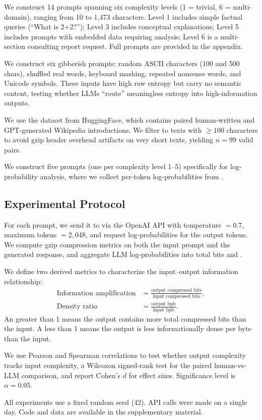 We construct 14 prompts spanning six complexity levels (1 = trivial, 6 = multi-domain), ranging from 10 to 1{,}473 characters. Level 1 includes simple factual queries (\eg ``What is 2+2?''); Level 3 includes conceptual explanations; Level 5 includes prompts with embedded data requiring analysis; Level 6 is a multi-section consulting report request. Full prompts are provided in the appendix.

We construct six gibberish prompts: random ASCII characters (100 and 500 chars), shuffled real words, keyboard mashing, repeated nonsense words, and Unicode symbols. These inputs have high raw entropy but carry no semantic content, testing whether LLMs ``route'' meaningless entropy into high-information outputs.

We use the \gptwiki dataset from HuggingFace, which contains paired human-written and GPT-generated Wikipedia introductions. We filter to texts with $\geq 100$ characters to avoid gzip header overhead artifacts on very short texts, yielding $n = 99$ valid pairs.

We construct five prompts (one per complexity level 1--5) specifically for log-probability analysis, where we collect per-token log-probabilities from \gptmini.

\subsection{Experimental Protocol}
\label{sec:protocol}

For each prompt, we send it to \gptmini via the OpenAI API with temperature $= 0.7$, maximum tokens $= 2{,}048$, and request log-probabilities for the output tokens. We compute gzip compression metrics on both the input prompt and the generated response, and aggregate LLM log-probabilities into total bits and \bpt.

We define two derived metrics to characterize the input--output information relationship:
\begin{align}
    \text{Information amplification} &= \frac{\text{output compressed bits}}{\text{input compressed bits}}, \label{eq:amp} \\
    \text{Density ratio} &= \frac{\text{output bpb}}{\text{input bpb}}. \label{eq:density}
\end{align}
An \infoamp greater than 1 means the output contains more total compressed bits than the input. A \densityratio less than 1 means the output is less informationally dense per byte than the input.

We use Pearson and Spearman correlations to test whether output complexity tracks input complexity, a Wilcoxon signed-rank test for the paired human-vs-LLM comparison, and report Cohen's $d$ for effect sizes. Significance level is $\alpha = 0.05$.

All experiments use a fixed random seed (42). API calls were made on a single day. Code and data are available in the supplementary material.
